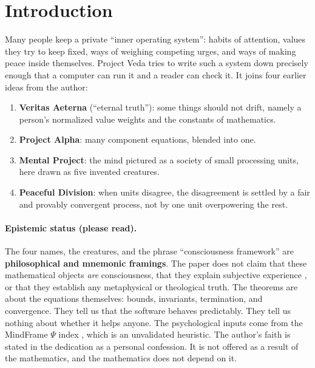 \documentclass[11pt]{article}
\theoremstyle{definition}
\theoremstyle{remark}
\begin{document}
\tableofcontents
\newpage

\section{Introduction}
Many people keep a private ``inner operating system'': habits of attention, values they try to keep fixed, ways of weighing competing urges, and ways of making peace inside themselves. Project Veda tries to write such a system down precisely enough that a computer can run it and a reader can check it. It joins four earlier ideas from the author:

\begin{enumerate}
\item \textbf{Veritas Aeterna} (``eternal truth''): some things should not drift, namely a person's normalized value weights and the constants of mathematics.
\item \textbf{Project Alpha}: many component equations, blended into one.
\item \textbf{Mental Project}: the mind pictured as a society of small processing units, here drawn as five invented creatures.
\item \textbf{Peaceful Division}: when units disagree, the disagreement is settled by a fair and provably convergent process, not by one unit overpowering the rest.
\end{enumerate}

\paragraph{Epistemic status (please read).} The four names, the creatures, and the phrase ``consciousness framework'' are \textbf{philosophical and mnemonic framings}. The paper does not claim that these mathematical objects \emph{are} consciousness, that they explain subjective experience \citep[the ``hard problem'';][]{chalmers1995}, or that they establish any metaphysical or theological truth. The theorems are about the equations themselves: bounds, invariants, termination, and convergence. They tell us that the software behaves predictably. They tell us nothing about whether it helps anyone. The psychological inputs come from the MindFrame $\Psi$ index \citep{espinosa2026mindframe}, which is an unvalidated heuristic. The author's faith is stated in the dedication as a personal confession. It is not offered as a result of the mathematics, and the mathematics does not depend on it.
\end{document}
